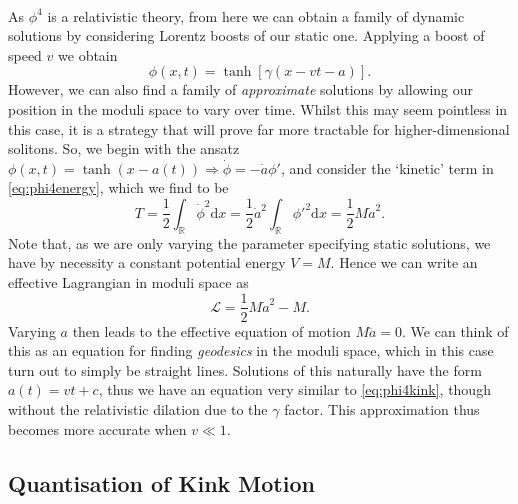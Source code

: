 \documentclass[11pt, fleqn]{article}
\begin{document}
\paragraph{} As $ \phi^4 $ is a relativistic theory, from here we can obtain a family of dynamic solutions by considering Lorentz boosts of our static one. Applying a boost of speed $ v $ we obtain
	\begin{equation}\label{eq:phi4kink}
		\phi(x,t) = \tanh\left[ \gamma ( x - vt - a ) \right].
	\end{equation}
However, we can also find a family of \textit{approximate} solutions by allowing our position in the moduli space to vary over time. Whilst this may seem pointless in this case, it is a strategy that will prove far more tractable for higher-dimensional solitons. So, we begin with the ansatz $ \phi(x,t) = \tanh(x - a(t)) \Rightarrow \dot{\phi} = -\dot{a}\phi' $, and consider the `kinetic' term in \eqref{eq:phi4energy}, which we find to be
	\begin{equation}\label{key}
		T = \frac{1}{2} \int_\mathbb{R} \dot{\phi}^2 \mathrm{d}x = \frac{1}{2} \dot{a}^2 \int_\mathbb{R} \phi'^2 \mathrm{d}x = \frac{1}{2} M \dot{a}^2.
	\end{equation}
Note that, as we are only varying the parameter specifying static solutions, we have by necessity a constant potential energy $ V = M $. Hence we can write an effective Lagrangian in moduli space as
	\begin{equation}\label{key}
		\mathscr{L} = \frac{1}{2} M \dot{a}^2 - M.
	\end{equation}
Varying $ a $ then leads to the effective equation of motion $ M \ddot{a} = 0 $. We can think of this as an equation for finding \textit{geodesics} in the moduli space, which in this case turn out to simply be straight lines. Solutions of this naturally have the form $ a(t) = vt + c $, thus we have an equation very similar to \eqref{eq:phi4kink}, though without the relativistic dilation due to the $ \gamma $ factor. This approximation thus becomes more accurate when $ v \ll 1 $.

\subsection{Quantisation of Kink Motion}
\end{document}
